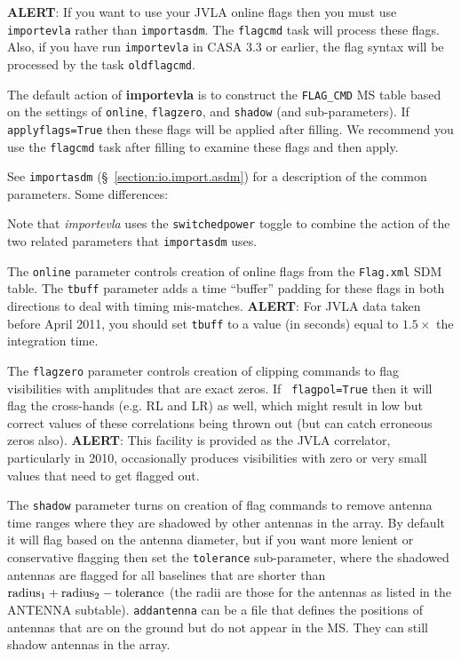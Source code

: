 {\bf ALERT}: If you want to use your JVLA online flags then you must
use {\tt importevla} rather than {\tt importasdm}.  The {\tt flagcmd} 
task will process these flags. Also, if you have run {\tt importevla}
in CASA 3.3 or earlier, the flag syntax will be processed by the task
{\tt oldflagcmd}. 

The default action of {\bf importevla} is to construct the {\tt FLAG\_CMD} 
MS table based on the settings of {\tt online}, {\tt flagzero}, and
{\tt shadow} (and sub-parameters).  If {\tt applyflags=True} then these
flags will be applied after filling.  We recommend you use the {\tt flagcmd}
task after filling to examine these flags and then apply.

See {\tt importasdm} (\S~\ref{section:io.import.asdm}) for a
description of the common parameters.  Some differences:

Note that {\it importevla} uses the {\tt switchedpower} toggle to combine the
action of the two related parameters that {\tt importasdm} uses.

The {\tt online} parameter controls creation of online flags from the 
{\tt Flag.xml} SDM table. The {\tt tbuff} parameter adds a time ``buffer''
padding for these flags in both directions to deal with timing mis-matches.
{\bf ALERT}: For JVLA data taken before April 2011, you should set {\tt tbuff}
to a value (in seconds) equal to $1.5\times$ the integration time.

The {\tt flagzero} parameter controls creation of clipping commands to
flag visibilities with amplitudes that are exact zeros. If {\tt
  flagpol=True} then it will flag the cross-hands (e.g. RL and LR) as
well, which might result in low but correct values of these
correlations being thrown out (but can catch erroneous zeros also).
{\bf ALERT}: This facility is provided as the JVLA correlator,
particularly in 2010, occasionally produces visibilities with zero or
very small values that need to get flagged out.

The {\tt shadow} parameter turns on creation of flag commands to
remove antenna time ranges where they are shadowed by other antennas
in the array.  By default it will flag based on the antenna diameter,
but if you want more lenient or conservative flagging then set the
{\tt tolerance} sub-parameter, where the shadowed antennas are flagged
for all baselines that are shorter than ${\rm radius}_1 + {\rm
  radius}_2 - {\rm tolerance}$
(the radii are those for the antennas as listed in the ANTENNA
subtable). {\tt addantenna} can be a file that defines the positions
of antennas that are on the ground but do not appear in the MS. They
can still shadow antennas in the array. 

